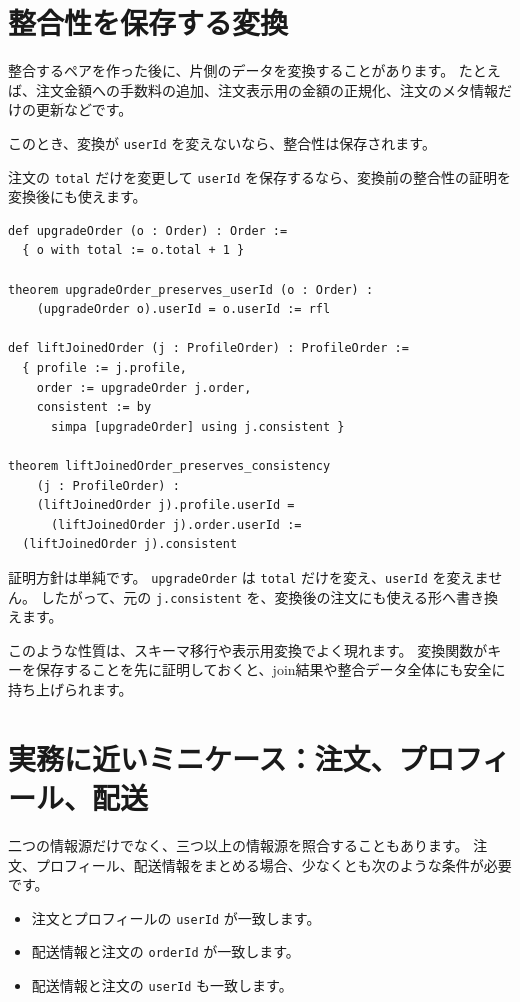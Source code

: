 \section{整合性を保存する変換}

整合するペアを作った後に、片側のデータを変換することがあります。
たとえば、注文金額への手数料の追加、注文表示用の金額の正規化、注文のメタ情報だけの更新などです。

このとき、変換が \texttt{userId} を変えないなら、整合性は保存されます。

注文の \texttt{total} だけを変更して \texttt{userId} を保存するなら、変換前の整合性の証明を変換後にも使えます。

\begin{listing}[htbp]
\begin{verbatim}
def upgradeOrder (o : Order) : Order :=
  { o with total := o.total + 1 }

theorem upgradeOrder_preserves_userId (o : Order) :
    (upgradeOrder o).userId = o.userId := rfl

def liftJoinedOrder (j : ProfileOrder) : ProfileOrder :=
  { profile := j.profile,
    order := upgradeOrder j.order,
    consistent := by
      simpa [upgradeOrder] using j.consistent }

theorem liftJoinedOrder_preserves_consistency
    (j : ProfileOrder) :
    (liftJoinedOrder j).profile.userId =
      (liftJoinedOrder j).order.userId :=
  (liftJoinedOrder j).consistent
\end{verbatim}
\caption{\texttt{liftJoinedOrder}}
\label{lst:ch23-preserve-consistency}
\end{listing}

証明方針は単純です。
\texttt{upgradeOrder} は \texttt{total} だけを変え、\texttt{userId} を変えません。
したがって、元の \texttt{j.consistent} を、変換後の注文にも使える形へ書き換えます。

このような性質は、スキーマ移行や表示用変換でよく現れます。
変換関数がキーを保存することを先に証明しておくと、join結果や整合データ全体にも安全に持ち上げられます。

\section{実務に近いミニケース：注文、プロフィール、配送}

二つの情報源だけでなく、三つ以上の情報源を照合することもあります。
注文、プロフィール、配送情報をまとめる場合、少なくとも次のような条件が必要です。

\begin{itemize}
\item 注文とプロフィールの \texttt{userId} が一致します。
\item 配送情報と注文の \texttt{orderId} が一致します。
\item 配送情報と注文の \texttt{userId} も一致します。
\end{itemize}

